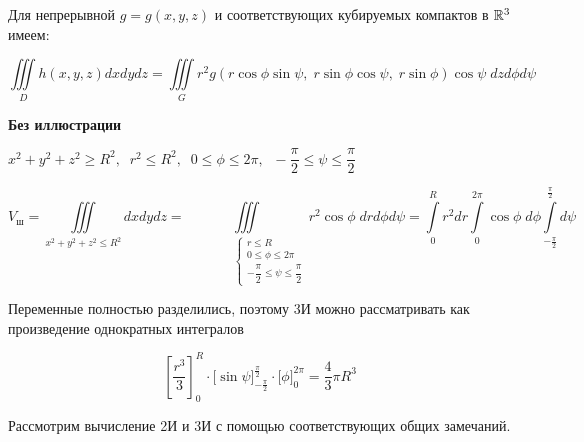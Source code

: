 \documentclass[../../main.tex]{subfiles}
\begin{document}
\begin{exmp}
\begin{itemize}
			Для непрерывной $g=g(x, y, z)$ и соответствующих
			кубируемых компактов в $\mathbb{R}^3$ имеем:
			
			\begin{equation}
			\label{lec15:45}
			\iiint\limits_{D} h(x, y, z) dx dy dz=
			\iiint\limits_{G} r^2g(r \cos{\phi} \sin{\psi},\; r \sin{\phi} \cos{\psi},\;
			 r \sin{\phi})\cos{\psi}\; dz d\phi d\psi
			\end{equation}
			
		\end{itemize}
	\end{exmp}

	\begin{exmp}
		\textbf{Без иллюстрации}
		
		
		$x^2 + y^2 + z^2 \geq R^2, \;\; r^2 \leq R^2, \;\; 0 \leq \phi \leq 2\pi, 
		\;\; -\dfrac{\pi}{2} \leq \psi \leq \dfrac{\pi}{2}$
		
		\[V_{\text{ш}} = \iiint\limits_{x^2 + y^2 + z^2 \leq R^2} dxdydz = 
		\iiint\limits_{
			\;\;\;\;\;\;\;\;\;\;\;\;\;\;\;\;\;
			\begin{cases}
			r \leq R\\
			0 \leq \phi \leq 2\pi\\
			-\dfrac{\pi}{2} \leq \psi \leq \dfrac{\pi}{2}
			\end{cases}
		}r^2\cos \phi \; dr d\phi d\psi = \int\limits_{0}^{R}r^2dr\int\limits_{0}^
	{2\pi}\cos\phi \; d\phi \int\limits_{-\frac{\pi}{2}}^{\frac{\pi}{2}}d\psi\]
		
		Переменные полностью разделились, поэтому 3И можно рассматривать как 
		произведение
		 однократных интегралов
		
		\[
		\left[\dfrac{r^3}{3}\right]_{0}^{R} \cdot \Big[\sin \psi 
		\Big]_{-\frac{\pi}{2}}^{\frac{\pi}{2}} \cdot \Big[\phi\Big]_{0}^{2\pi} = 
		\dfrac{4}{3} \pi R^3 
		\]
	\end{exmp}
	
	Рассмотрим вычисление 2И и 3И с помощью соответствующих общих замечаний. 
	
\end{document}

